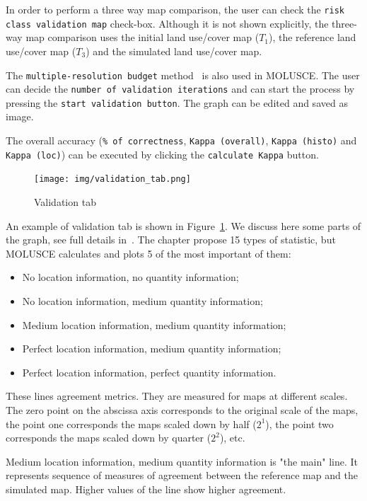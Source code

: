 \documentclass{report}
\begin{document}
In order to perform a three way map comparison, the user can check the \verb+risk class validation map+
check-box. Although it is not shown explicitly, the three-way map comparison uses the initial land
use/cover map ($T_1$), the reference land use/cover map ($T_3$) and the simulated land use/cover map.

The \verb+multiple-resolution budget+ method~\cite[Chapter~17]{pontius2004maps_aggreament} is also used in MOLUSCE. The user can decide the 
\verb+number of validation iterations+ and can start the process by pressing the \verb+start validation button+.
The graph can be edited and saved as image.

The overall accuracy (\verb+% of correctness+, \verb+Kappa (overall)+, \verb+Kappa (histo)+ and \verb+Kappa (loc)+) can be
executed by clicking the \verb+calculate Kappa+ button.

\begin{figure}[h!]
\centering
\texttt{[image: img/validation\_tab.png]}
\caption{Validation tab}
\label{fig:validation_tab}
\end{figure}

An example of validation tab is shown in Figure~\ref{fig:validation_tab}.
We discuss here some parts of the graph, see full details in~\cite[Chapter~17]{pontius2004maps_aggreament}.
The chapter propose 15 types of statistic, but MOLUSCE calculates and plots 5 of the most important of them:
\begin{itemize}
  \item No location information, no quantity information;
  \item No location information, medium quantity information;
  \item Medium location information, medium quantity information;
  \item Perfect location information, medium quantity information;
  \item Perfect location information, perfect quantity information.
\end{itemize}

These lines agreement metrics. They are measured for maps at different scales. 
The zero point on the abscissa axis corresponds to
the original scale of the maps, the point one corresponds the maps scaled down by half ($2^1$), the point
two corresponds the maps scaled down by quarter ($2^2$), etc.

Medium location information, medium quantity information is "the main" line.
It represents sequence of measures of agreement between the reference map and the simulated map.
Higher values of the line show higher agreement.
\end{document}
